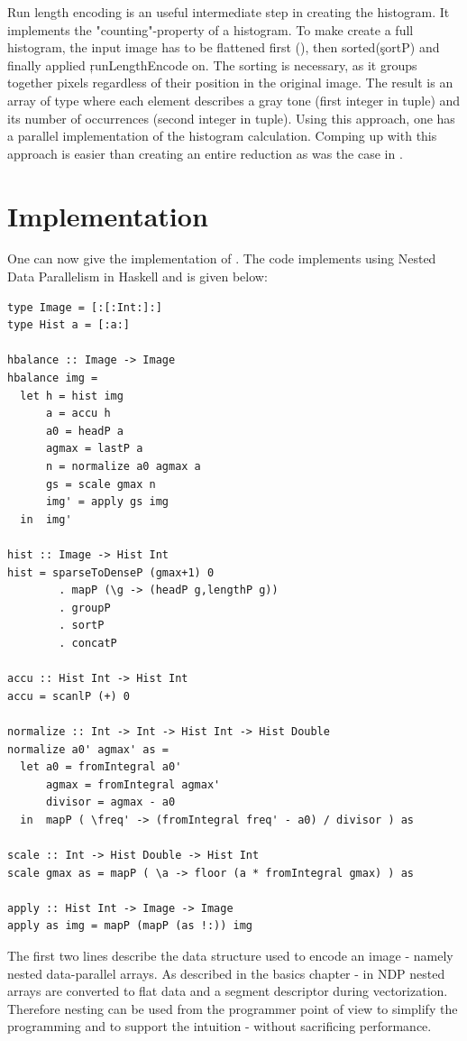     Run length encoding is an useful intermediate step in
    creating the histogram. It implements the "counting"-property
    of a histogram.
    To make create a full histogram, the input image has to be flattened first (),
    then sorted(\c{sortP}) and finally applied \c{runLengthEncode} on.
    The sorting is necessary, as it groups together pixels regardless of their
    position in the original image.
    The result is an array of type  where each element
    describes a gray tone (first integer in tuple) and its number of
    occurrences (second integer in tuple).
    Using this approach, one has a parallel implementation of the histogram calculation.
    Comping up with this approach is easier than creating an entire
    reduction as was the case in \man.
    
\section{Implementation}
  One can now give the implementation of \ndpn. The code
  implements \algo using Nested Data Parallelism in Haskell
  and is given below:
  \begin{lstlisting}
type Image = [:[:Int:]:]
type Hist a = [:a:]

hbalance :: Image -> Image
hbalance img =
  let h = hist img
      a = accu h
      a0 = headP a
      agmax = lastP a
      n = normalize a0 agmax a
      gs = scale gmax n
      img' = apply gs img
  in  img'

hist :: Image -> Hist Int
hist = sparseToDenseP (gmax+1) 0
        . mapP (\g -> (headP g,lengthP g))
        . groupP
        . sortP
        . concatP

accu :: Hist Int -> Hist Int
accu = scanlP (+) 0

normalize :: Int -> Int -> Hist Int -> Hist Double
normalize a0' agmax' as =
  let a0 = fromIntegral a0'
      agmax = fromIntegral agmax'
      divisor = agmax - a0
  in  mapP ( \freq' -> (fromIntegral freq' - a0) / divisor ) as

scale :: Int -> Hist Double -> Hist Int
scale gmax as = mapP ( \a -> floor (a * fromIntegral gmax) ) as

apply :: Hist Int -> Image -> Image
apply as img = mapP (mapP (as !:)) img
  \end{lstlisting}
  The first two lines describe the data structure used to encode an image - 
  namely nested data-parallel arrays.
  As described in the basics chapter - in NDP
  nested arrays are converted to flat data and a segment descriptor
  during vectorization. Therefore nesting
  can be used from the programmer point of view to simplify
  the programming and to support the intuition - without
  sacrificing performance.
  
